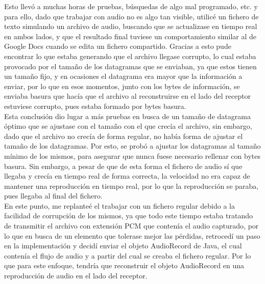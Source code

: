 Esto llevó a muchas horas de pruebas, búsquedas de algo mal programado, etc. y
para ello, dado que trabajar con audio no es algo tan visible, utilicé un
fichero de texto simulando un archivo de audio, buscando que se actualizase en
tiempo real en ambos lados, y que el resultado final tuviese un comportamiento
similar al de Google Docs cuando se edita un fichero compartido. Gracias a esto
pude encontrar lo que estaba generando que el archivo llegase corrupto, lo cual
estaba provocado por el tamaño de los datagramas que se enviaban, ya que estos
tienen un tamaño fijo, y en ocasiones el datagrama era mayor que la información
a enviar, por lo que en esos momentos, junto con los bytes de información, se
enviaba basura que hacía que el archivo al reconstruirse en el lado del receptor
estuviese corrupto, pues estaba formado por bytes basura.\\

Esta conclusión dio lugar a más pruebas en busca de un tamaño de datagrama
óptimo que se ajustase con el tamaño con el que crecía el archivo, sin embargo,
dado que el archivo no crecía de forma regular, no había forma de ajustar el
tamaño de los datagramas. Por esto, se probó a ajustar los datagramas al tamaño
mínimo de los mismos, para asegurar que nunca fuese  necesario rellenar con
bytes basura. Sin embargo, a pesar de que de esta forma el fichero de audio sí
que llegaba y crecía en tiempo real de forma correcta, la velocidad no era capaz
de mantener una reproducción en tiempo real, por lo que la reproducción se
paraba, pues llegaba al final del fichero.\\

En este punto, me replanteé el trabajar con un fichero regular debido a la
facilidad de corrupción de los mismos, ya que todo este tiempo estaba tratando
de transmitir el archivo con extensión PCM que contenía el audio capturado, por
lo que en busca de un elemento que tolerase mejor las pérdidas, retrocedí un
paso en la implementación y decidí enviar el objeto AudioRecord de Java, el cual
contenía el flujo de audio y a partir del cual se creaba el fichero regular. Por
lo que para este enfoque, tendría que reconstruir el objeto AudioRecord en una
reproducción de audio en el lado del receptor.\\


